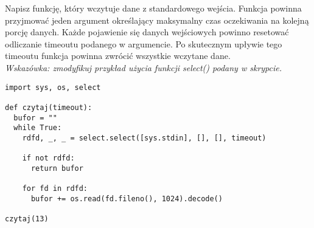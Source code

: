 % 
% 
% 
% 




\dbEntryCheckResults
Napisz funkcję, który wczytuje dane z standardowego wejścia. Funkcja powinna przyjmować jeden argument określający maksymalny czas oczekiwania na kolejną porcję danych.
Każde pojawienie się danych wejściowych powinno resetować odliczanie timeoutu podanego w argumencie. Po skutecznym upływie tego timeoutu funkcja powinna zwrócić wszystkie wczytane dane.
\\\textit{Wskazówka: zmodyfikuj przykład użycia funkcji select() podany w skrypcie.}
\fi

\dbEntryCheckResults
\begin{verbatim}
import sys, os, select

def czytaj(timeout):
  bufor = ""
  while True:
    rdfd, _, _ = select.select([sys.stdin], [], [], timeout)

    if not rdfd:
      return bufor

    for fd in rdfd:
      bufor += os.read(fd.fileno(), 1024).decode()

czytaj(13)
\end{verbatim}

